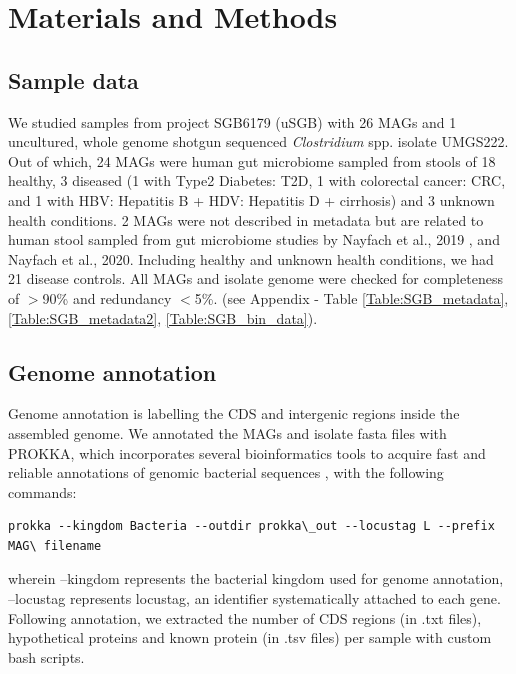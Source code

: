\documentclass[11pt]{article}
\begin{document}
\section{Materials and Methods}
\subsection{Sample data}

We studied samples from project SGB6179 (uSGB) with 26 MAGs and 1 uncultured, whole genome shotgun sequenced \textit{Clostridium} spp. isolate UMGS222. Out of which, 24 MAGs were human gut microbiome sampled from stools of 18 healthy, 3 diseased (1 with Type2 Diabetes: T2D, 1 with colorectal cancer: CRC, and 1 with HBV: Hepatitis B + HDV: Hepatitis D + cirrhosis) and 3 unknown health conditions. 2 MAGs were not described in metadata but are related to human stool sampled from gut microbiome studies by Nayfach et al., 2019 \cite{Nayfach_2019}, and Nayfach et al., 2020\cite{Shi2020}. Including healthy and unknown health conditions, we had 21 disease controls. All MAGs and isolate genome were checked for completeness of $>$90\% and redundancy $<$5\%. (see Appendix - Table \ref{Table:SGB_metadata}, \ref{Table:SGB_metadata2}, \ref{Table:SGB_bin_data}). 

\subsection{Genome annotation}
Genome annotation is labelling the CDS and intergenic regions inside the assembled genome. We annotated the MAGs and isolate fasta files with PROKKA, which incorporates several bioinformatics tools to acquire fast and reliable annotations of genomic bacterial sequences \cite{Seemann2014}, with the following commands: 
\newpage
\begin{lstlisting}
prokka --kingdom Bacteria --outdir prokka\_out --locustag L --prefix MAG\ filename
\end{lstlisting}
wherein --kingdom represents the bacterial kingdom used for genome annotation, --locustag represents locustag, an identifier systematically attached to each gene. Following annotation, we extracted the number of CDS regions (in .txt files), hypothetical proteins and known protein (in .tsv files) per sample with custom bash scripts. 
\end{document}
